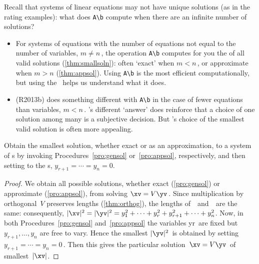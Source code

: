 Recall that systems of linear equations may not have unique solutions (as in the rating examples): what does \verb|A\b| compute when there are an infinite number of solutions?
\begin{itemize}
\item For systems of equations with the number of equations not equal to the number of variables, \(m\neq n\)\,, the \script[2] operation \verb|A\b| computes for you the \emph{} of all valid solutions (\autoref{thm:smallsoln}): often `exact' when \(m<n\)\,, or approximate when \(m>n\) (\autoref{thm:appsol}).  
Using \verb|A\b| is the most efficient computationally, but using the \svd\ helps us understand what it does.

\item \script[1] (R2013b) does something different with \verb|A\b| in the case of fewer equations than variables, \(m<n\)\,. 
\script[1]'s different `answer' does reinforce that a choice of one solution among many is a subjective decision.
But \script[2]'s choice of the smallest valid solution is often more appealing.

\end{itemize}

\begin{theorem} \label{thm:smallsoln}
Obtain the {smallest solution}, whether exact or as an approximation, to a system of s by invoking Procedures~\ref{pro:gensol} or~\ref{pro:appsol}, respectively, and then setting to  the s, \(y_{r+1}=\cdots=y_n=0\).
\end{theorem}
\begin{proof} %
We obtain all possible solutions, whether exact (\autoref{pro:gensol}) or approximate (\autoref{pro:appsol}), from solving \(\xv=V\yv\)\,.
Since multiplication by orthogonal~\(V\) preserves lengths (\autoref{thm:orthog}), the lengths of~\xv\ and~\yv\ are the same: consequently, \(|\xv|^2=|\yv|^2=y_1^2+\cdots+y_r^2+y_{r+1}^2+\cdots+y_n^2\).  
Now, in both Procedures~\ref{pro:gensol} and~\ref{pro:appsol} the variables \hlist yr\ are fixed but \(y_{r+1},\ldots,y_n\) are free to vary.
Hence the smallest \(|\yv|^2\)~is obtained by setting \(y_{r+1}=\cdots=y_n=0\)\,. 
Then this gives the particular solution~\(\xv=V\yv\)\ of smallest~\(|\xv|\).
\end{proof}


